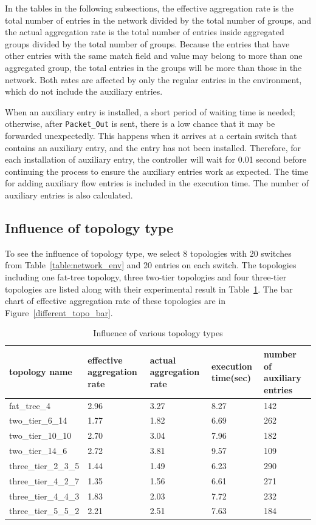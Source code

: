 In the tables in the following subsections, the effective aggregation rate is the total number of entries in the network divided by the total number of groups, and the actual aggregation rate is the total number of entries inside aggregated groups divided by the total number of groups. Because the entries that have other entries with the same match field and value may belong to more than one aggregated group, the total entries in the groups will be more than those in the network. Both rates are affected by only the regular entries in the environment, which do not include the auxiliary entries.

When an auxiliary entry is installed, a short period of waiting time is needed; otherwise, after \texttt{Packet\_Out} is sent, there is a low chance that it may be forwarded unexpectedly. This happens when it arrives at a certain switch that contains an auxiliary entry, and the entry has not been installed. Therefore, for each installation of auxiliary entry, the controller will wait for 0.01 second before continuing the process to ensure the auxiliary entries work as expected. The time for adding auxiliary flow entries is included in the execution time. The number of auxiliary entries is also calculated.

\subsection{Influence of topology type}
To see the influence of topology type, we select 8 topologies with 20 switches from Table~\ref{table:network_env} and 20 entries on each switch. The topologies including one fat-tree topology, three two-tier topologies and four three-tier topologies are listed along with their experimental result in Table~\ref{table:different_topo_type}. The bar chart of effective aggregation rate of these topologies are in Figure~\ref{different_topo_bar}.

\begin{table}
\centering
\caption{Influence of various topology types}
\begin{tabular}{|l|p{2.5cm}|p{2.5cm}|p{1.9cm}|p{2.8cm}|}
\hline topology name & effective aggregation rate & actual aggregation rate & execution time(sec) & number of auxiliary entries \\
\hline
\hline fat\_tree\_4 & 2.96 & 3.27 & 8.27 & 142 \\
\hline two\_tier\_6\_14 & 1.77 & 1.82 & 6.69 & 262 \\ 
\hline two\_tier\_10\_10 & 2.70 & 3.04 & 7.96 & 182 \\
\hline two\_tier\_14\_6 & 2.72 & 3.81 & 9.57 & 109 \\ 
\hline three\_tier\_2\_3\_5 & 1.44 & 1.49 & 6.23 & 290 \\
\hline three\_tier\_4\_2\_7 & 1.35 & 1.56 & 6.61 & 271 \\
\hline three\_tier\_4\_4\_3 & 1.83 & 2.03 & 7.72 & 232 \\
\hline three\_tier\_5\_5\_2 & 2.21 & 2.51 & 7.63 & 184 \\
\hline
\end{tabular}
\label{table:different_topo_type}
\end{table}

